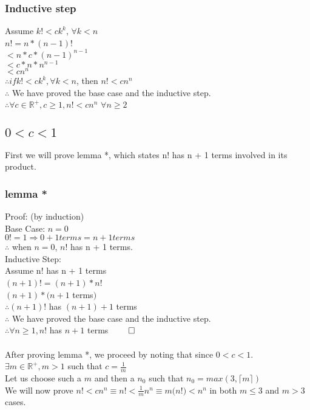 \documentclass{article}
\begin{document}
      \subsubsection{Inductive step}
        Assume $k! < ck^{k}$, $\forall k < n$ \\
        $n$!$ = n * (n - 1)$! \\
        $< n * c * {(n - 1)}^{n - 1}$ \\
        $< c * n * n^{n - 1}$ \\
        $< cn^{n}$ \\
        $\therefore if k! < ck^{k}, \forall k < n$, then $n! < cn^{n}$ \\
        $\therefore$ We have proved the base case and the inductive step. \\
        $\therefore \forall c \in \mathbb{R}^{+}, c \geq 1, n! < cn^{n}$ $\forall n \geq 2$
    \subsection{$0 < c < 1$}
      First we will prove lemma *, which states n! has n + 1 terms involved in its product.
      \subsubsection{lemma *}
        Proof: (by induction) \\
        Base Case: $n = 0$ \\
        $0! = 1 \Rightarrow 0 + 1 terms = n + 1 terms$ \\
        $\therefore$ when $n = 0$, $n$! has n + 1 terms. \\
        Inductive Step: \\
        Assume n! has n + 1 terms \\
        $(n + 1)! = (n + 1) * n$! \\
        $(n + 1) * (n + 1$ terms$)$ \\
        $\therefore (n + 1)$! has $(n + 1) + 1$ terms \\
        $\therefore$ We have proved the base case and the inductive step. \\
        $\therefore \forall n \geq 1, n!$ has $n + 1$ terms $\qed$ \\
        \\
        After proving lemma *, we proceed by noting that since $0 < c < 1$. $\exists m \in \mathbb{R}^{+}, m > 1$ such that $c = \frac{1}{m}$ \\
        Let us choose such a $m$ and then a $n_{0}$ such that $n_{0} = max(3,\lceil m \rceil)$ \\
        We will now prove $n$!$ < cn^{n} \equiv n$!$ < \frac{1}{m}n^{n} \equiv m(n$!$) < n^{n}$ in both $m \leq 3$ and $m > 3$ cases.\\
\end{document}
